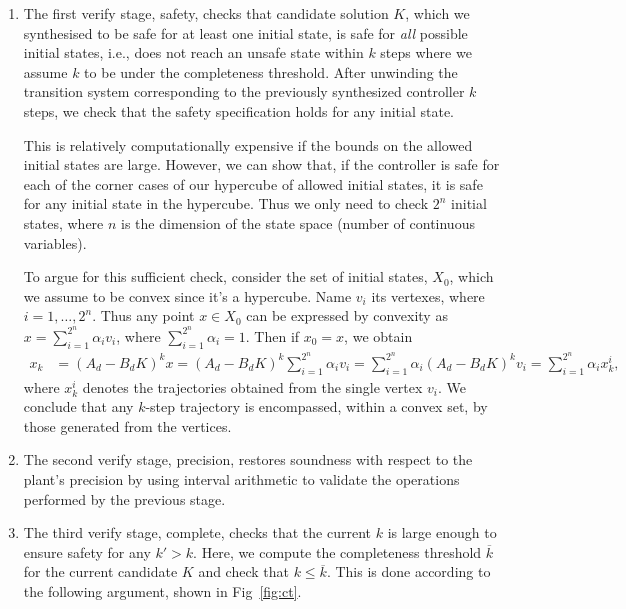 \documentclass[runningheads,a4paper]{llncs}
\begin{document}
\begin{enumerate}
\item The first {\sc verify} stage, {\sc safety}, checks that candidate
solution $K$, which we synthesised to be safe for at least one initial state, is safe for \emph{all} possible initial states, i.e., does not reach an unsafe
state within $k$ steps where we assume $k$ to be under the completeness threshold. 
After unwinding the transition system corresponding to the previously synthesized controller
$k$ steps, we check that the safety specification holds for any initial state. 

This is relatively computationally expensive if the bounds on the
allowed initial states are large.  However, we can show that, if the
controller is safe for each of the corner cases of our hypercube of
allowed initial states, it is safe for any initial state in the
hypercube. Thus we only need to check $2^n$ initial states, where $n$
is the dimension of the state space (number of continuous variables). 

To argue for this sufficient check, 
consider the set of initial states, $X_0$, which we assume to be convex since it's a hypercube. 
Name $v_i$ its vertexes, where $i=1,\ldots, 2^n$.  
Thus any point $x \in X_0$ can be expressed by convexity as $x = \sum_{i=1}^{2^n} \alpha_i v_i$, 
where $\sum_{i=1}^{2^n} \alpha_i =1$. Then if $x_0=x$, we obtain 
\begin{align*}
x_k   &= (A_d - B_d K)^k x = (A_d - B_d K)^k \sum_{i=1}^{2^n} \alpha_i v_i 
      = \sum_{i=1}^{2^n} \alpha_i (A_d - B_d K)^k v_i = \sum_{i=1}^{2^n} \alpha_i x_k^i, 
 \end{align*}     
where $x_k^i$ denotes the trajectories obtained from the single vertex $v_i$. 
We conclude that any $k$-step trajectory is encompassed, within a convex set, by those generated from the vertices. 

\item The second {\sc verify} stage, {\sc precision}, 
 restores soundness with respect to the plant's precision
by using interval arithmetic \cite{moore1966interval} to validate the 
operations performed by the previous stage. 

\item The third {\sc verify} stage, {\sc complete}, checks that the
current $k$ is large enough to ensure safety for any $k'{>}k$.  Here, we compute the
completeness threshold $\overline{k}$ for the current candidate $K$
and check that $k{\leq}\overline{k}$. This is done according to the following argument, 
shown in Fig~\ref{fig:ct}.  


\end{enumerate}
\end{document}
